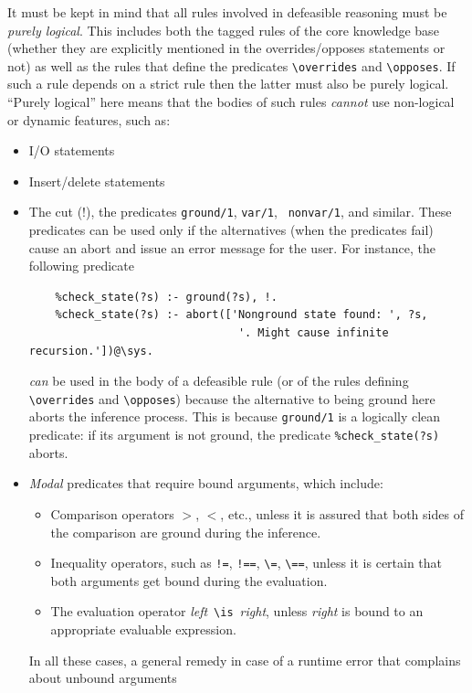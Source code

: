 \documentclass[11pt]{article}
\newcommand{\bs}{\textbackslash}
\begin{document}
It must be kept in mind that all rules involved in defeasible reasoning
must be \emph{purely logical}.
This includes both the tagged rules of the
core knowledge base (whether they are explicitly mentioned in the
overrides/opposes statements or not) as well as the rules that define the
predicates {\tt \bs{}overrides} and {\tt \bs{}opposes}.
If such a rule depends on a strict
rule then the latter must also be purely logical.
``Purely logical'' here means that the
bodies of such rules \emph{cannot} use non-logical or dynamic features,
such as:
\begin{itemize}
\item  I/O statements
\item  Insert/delete statements
\item  The cut (!), the predicates {\tt ground/1}, {\tt var/1}, {\tt
    nonvar/1}, and similar.
  These predicates can be used only if the alternatives (when
  the predicates fail) cause an abort and issue an error message for the user.
  For instance, the following predicate
\begin{verbatim}
    %check_state(?s) :- ground(?s), !.
    %check_state(?s) :- abort(['Nonground state found: ', ?s,
                                '. Might cause infinite recursion.'])@\sys.  
\end{verbatim}
  \emph{can} be used in the body of a defeasible rule (or of the rules defining
  {\tt \bs{}overrides} and {\tt \bs{}opposes}) because the alternative to being
  ground here aborts the inference process.
  This is because \texttt{ground/1} is a logically clean predicate: if its
  argument is not ground, the predicate \texttt{\%check\_state(?s)} aborts.  
\item \emph{Modal} predicates that require bound arguments, which include:
  \begin{itemize}
  \item  Comparison operators $>$, $<$, etc.,
    unless it is assured that both sides of the
    comparison are ground during the inference.
  \item  Inequality operators, such as {\tt !=}, {\tt !==}, \verb|\=|,
    \verb|\==|,  unless it is certain that both arguments get bound during
    the evaluation.
  \item  The evaluation operator \emph{left}~\texttt{\bs{}is}~\emph{right},
    unless \emph{right} is bound to an appropriate evaluable expression.  
  \end{itemize}
  In all these cases, a general remedy in case of a runtime error
  that complains about unbound arguments

\end{itemize}
\end{document}
